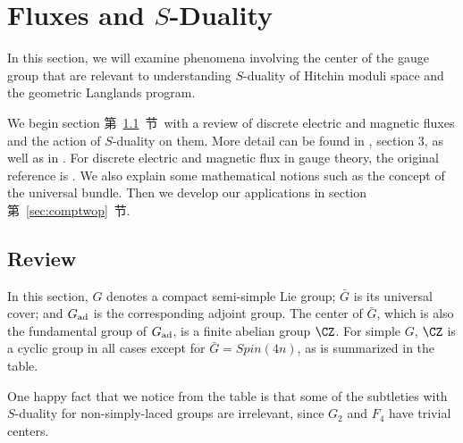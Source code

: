 
\section{Fluxes and $S$-Duality}

\label{sec:centertop}

In this section, we will examine phenomena involving the center of
the gauge group that are relevant to understanding $S$-duality of
Hitchin moduli space and the geometric Langlands program.

We begin section 第~\ref{sec:reviewthis}~节\ with a review of discrete electric
and magnetic fluxes and the action of $S$-duality on them. More
detail can be found in \cite{ref45} , section 3, as well as in
\cite{ref26}. For discrete electric and magnetic flux in gauge theory,
the original reference is \cite{ref101}. We also explain some mathematical notions such as the
concept of the universal bundle. Then we develop our applications
in section 第~\ref{sec:comptwop}~节.

\subsection{Review}

\label{sec:reviewthis}

In this section, $G$ denotes a compact semi-simple Lie group;
$\bar G$ is its universal cover; and $G_{\rm {ad}}$ is the
corresponding adjoint group.  The center of $\bar G$, which is
also the fundamental group of $G_{\rm {ad}}$, is a finite abelian
group $\CZ$.  For simple $G$, $\CZ$ is a cyclic group in all cases
except for $\bar G=Spin(4n)$, as is summarized in the table.

One happy fact that we notice from the table is that some of the
subtleties with $S$-duality for non-simply-laced groups are
irrelevant, since $G_2$ and $F_4$ have trivial centers.

\par\medskip

